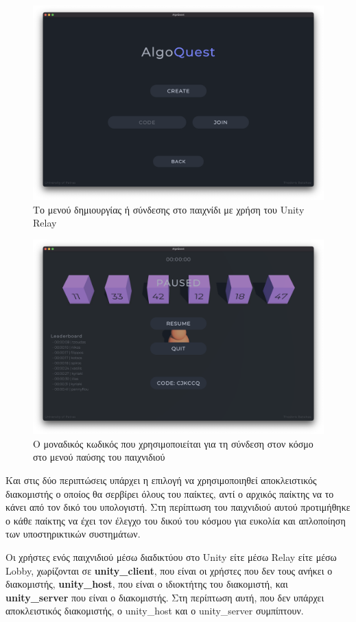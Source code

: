 \begin{figure}[H]
    \centering
    \includegraphics[width=0.8\linewidth]{sections/4/4/images/game_create_or_join_game_menu}
    \caption{Το μενού δημιουργίας ή σύνδεσης στο παιχνίδι με χρήση του Unity Relay}
    \label{fig:game_create_or_join_game_menu}
\end{figure}

\begin{figure}[H]
    \centering
    \includegraphics[width=0.8\linewidth]{sections/4/4/images/game_pause_menu}
    \caption{Ο μοναδικός κωδικός που χρησιμοποιείται για τη σύνδεση στον κόσμο στο μενού παύσης του παιχνιδιού}
    \label{fig:game_pause_menu}
\end{figure}

Και στις δύο περιπτώσεις υπάρχει η επιλογή να χρησιμοποιηθεί αποκλειστικός διακομιστής ο οποίος θα σερβίρει όλους του παίκτες, αντί ο αρχικός παίκτης να το κάνει από τον δικό του υπολογιστή. Στη περίπτωση του παιχνιδιού αυτού προτιμήθηκε ο κάθε παίκτης να έχει τον έλεγχο του δικού του κόσμου για ευκολία και απλοποίηση των υποστηρικτικών συστημάτων.

Οι χρήστες ενός παιχνιδιού μέσω διαδικτύου στο Unity είτε μέσω Relay είτε μέσω Lobby, χωρίζονται σε \textbf{\Gls{unity_client}}, που είναι οι χρήστες που δεν τους ανήκει ο διακομιστής, \textbf{\Gls{unity_host}}, που είναι ο ιδιοκτήτης του διακομιστή, και \textbf{\Gls{unity_server}} που είναι ο διακομιστής. Στη περίπτωση αυτή, που δεν υπάρχει αποκλειστικός διακομιστής, ο \Gls{unity_host} και ο \Gls{unity_server} συμπίπτουν.

